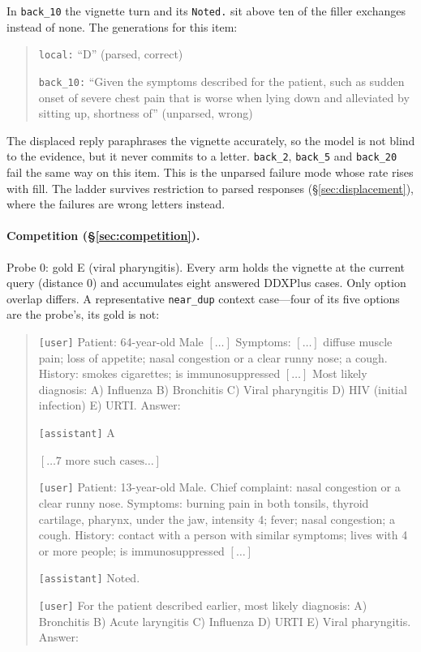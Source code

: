 \documentclass{article}
\begin{document}
\noindent In \texttt{back\_10} the vignette turn and its \texttt{Noted.} sit above ten of the
filler exchanges instead of none. The generations for this item:

\begin{quote}\small
\texttt{local:} ``D'' \hfill (parsed, correct)\par\smallskip
\texttt{back\_10:} ``Given the symptoms described for the patient, such as sudden onset of
severe chest pain that is worse when lying down and alleviated by sitting up, shortness of''
\hfill (unparsed, wrong)
\end{quote}

\noindent The displaced reply paraphrases the vignette accurately, so the model is not blind to
the evidence, but it never commits to a letter. \texttt{back\_2}, \texttt{back\_5} and
\texttt{back\_20} fail the same way on this item. This is the unparsed failure mode whose rate
rises with fill. The ladder survives restriction to parsed responses (\S\ref{sec:displacement}),
where the failures are wrong letters instead.

\paragraph{Competition (\S\ref{sec:competition}).}
Probe 0: gold E (viral pharyngitis). Every arm holds the vignette at the current query
(distance $0$) and accumulates eight answered DDXPlus cases. Only option overlap differs. A
representative \texttt{near\_dup} context case---four of its five options are the probe's, its
gold is not:

\begin{quote}\small
\texttt{[user]} Patient: 64-year-old Male $[\dots]$ Symptoms: $[\dots]$ diffuse muscle pain;
loss of appetite; nasal congestion or a clear runny nose; a cough. History: smokes cigarettes;
is immunosuppressed $[\dots]$ Most likely diagnosis: A) Influenza B) Bronchitis C) Viral
pharyngitis D) HIV (initial infection) E) URTI. Answer:\par\smallskip
\texttt{[assistant]} A\par\smallskip
$[\dots\text{7 more such cases}\dots]$\par\smallskip
\texttt{[user]} Patient: 13-year-old Male. Chief complaint: nasal congestion or a clear runny
nose. Symptoms: burning pain in both tonsils, thyroid cartilage, pharynx, under the jaw,
intensity 4; fever; nasal congestion; a cough. History: contact with a person with similar
symptoms; lives with 4 or more people; is immunosuppressed $[\dots]$\par\smallskip
\texttt{[assistant]} Noted.\par\smallskip
\texttt{[user]} For the patient described earlier, most likely diagnosis: A) Bronchitis
B) Acute laryngitis C) Influenza D) URTI E) Viral pharyngitis. Answer:
\end{quote}
\end{document}
